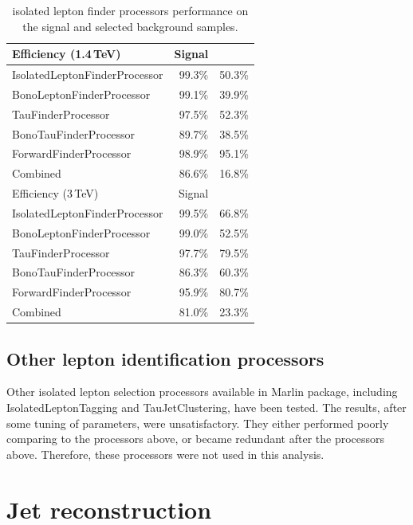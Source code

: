 \begin{table}[!tbp]
\begin{tabular}{lrr}
\hline
\hline
Efficiency (1.4\,TeV)  &  Signal & \HepProcess{\Pep \Pem \to \Pquark\Pquark\Pquark\Pquark\Plepton\Pnu} \\
\hline
IsolatedLeptonFinderProcessor & 99.3\% & 50.3\%  \\
BonoLeptonFinderProcessor & 99.1\% & 39.9\%  \\
TauFinderProcessor & 97.5\% & 52.3\%  \\
BonoTauFinderProcessor & 89.7\% & 38.5\%  \\
ForwardFinderProcessor & 98.9\% & 95.1\%  \\
Combined & 86.6\% & 16.8\%  \\
\hline
Efficiency (3\,TeV)  &  Signal  & \HepProcess{\Pep \Pem \to \Pquark\Pquark\Pquark\Pquark\Plepton\Pnu} \\
\hline
IsolatedLeptonFinderProcessor & 99.5\% & 66.8\%  \\
BonoLeptonFinderProcessor & 99.0\% & 52.5\%  \\
TauFinderProcessor & 97.7\% & 79.5\%  \\
BonoTauFinderProcessor & 86.3\% & 60.3\%  \\
ForwardFinderProcessor & 95.9\% & 80.7\%  \\
Combined & 81.0\% & 23.3\%  \\
\hline
\hline

\end{tabular}
\caption{isolated lepton finder processors performance on the signal and selected background samples.}
\label{tab:doubleHiggsIsoLepPerformance}
\end{table}

\subsection{Other lepton identification processors}

Other isolated lepton selection processors available in Marlin package, including IsolatedLeptonTagging and TauJetClustering, have been tested. The results, after some tuning of parameters, were unsatisfactory. They either performed poorly comparing to the processors above, or became redundant after the processors above. Therefore, these processors were not used in this analysis.




\section{Jet reconstruction}

